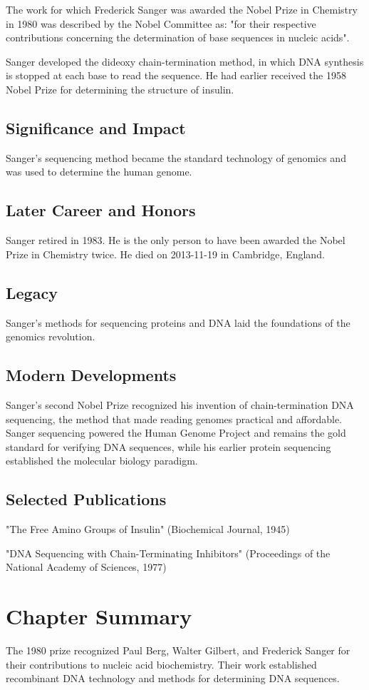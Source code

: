 The work for which Frederick Sanger was awarded the Nobel Prize in Chemistry in 1980 was described by the Nobel Committee as: "for their respective contributions concerning the determination of base sequences in nucleic acids".

Sanger developed the dideoxy chain-termination method, in which DNA synthesis is stopped at each base to read the sequence. He had earlier received the 1958 Nobel Prize for determining the structure of insulin.

\subsection*{Significance and Impact}

Sanger's sequencing method became the standard technology of genomics and was used to determine the human genome.

\subsection*{Later Career and Honors}

Sanger retired in 1983. He is the only person to have been awarded the Nobel Prize in Chemistry twice. He died on 2013-11-19 in Cambridge, England.

\subsection*{Legacy}

Sanger's methods for sequencing proteins and DNA laid the foundations of the genomics revolution.

\subsection*{Modern Developments}

Sanger's second Nobel Prize recognized his invention of chain-termination DNA sequencing, the method that made reading genomes practical and affordable. Sanger sequencing powered the Human Genome Project and remains the gold standard for verifying DNA sequences, while his earlier protein sequencing established the molecular biology paradigm.

\subsection*{Selected Publications}

"The Free Amino Groups of Insulin" (Biochemical Journal, 1945)

"DNA Sequencing with Chain-Terminating Inhibitors" (Proceedings of the National Academy of Sciences, 1977)

\clearpage

\section*{Chapter Summary}

The 1980 prize recognized Paul Berg, Walter Gilbert, and Frederick Sanger for their contributions to nucleic acid biochemistry. Their work established recombinant DNA technology and methods for determining DNA sequences.

